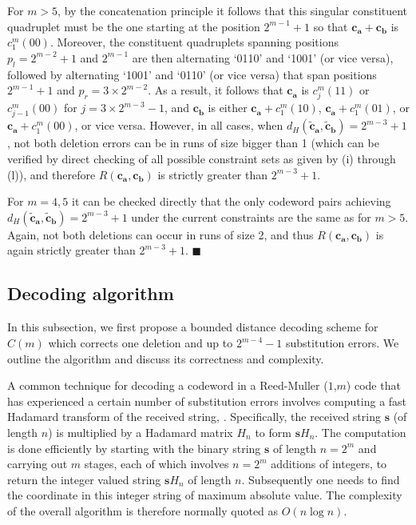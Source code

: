 For $m>5$, by the concatenation principle it follows that this
singular constituent quadruplet must be the one starting at the
position $2^{m-1}+1$ so that $\mathbf{c_a}+\mathbf{c_b}$ is
$c_1^m(00)$. Moreover, the constituent quadruplets spanning
positions $p_l=2^{m-2}+1$ and $2^{m-1}$ are then alternating
`0110' and `1001' (or vice versa), followed by alternating `1001'
and `0110' (or vice versa) that span positions $2^{m-1}+1$ and
$p_r=3\times 2^{m-2}$. As a result, it follows that $\mathbf{c_a}$
is $c_j^m(11)$ or $c_{j-1}^m(00)$ for $j=3\times 2^{m-3}-1$, and
$\mathbf{c_b}$ is either $\mathbf{c_a}+c_1^m(10)$,
$\mathbf{c_a}+c_1^m(01)$, or $\mathbf{c_a}+c_1^m(00)$, or vice
versa. However, in all cases, when
$d_{H}(\mathbf{\tilde{c}_a},\mathbf{\tilde{c}_b})=2^{m-3}+1$, not
both deletion errors can be in runs of size bigger than 1 (which
can be verified by direct checking of all possible constraint sets
as given by (i) through (l)), and therefore
$R(\mathbf{c_a},\mathbf{c_b})$ is strictly greater than
$2^{m-3}+1$.

For $m =4, 5$ it can be checked directly that the only codeword
pairs achieving
$d_{H}(\mathbf{\tilde{c}_a},\mathbf{\tilde{c}_b})=2^{m-3}+1$ under
the current constraints are the same as for $m>5$. Again, not both
deletions can occur in runs of size 2, and thus
$R(\mathbf{c_a},\mathbf{c_b})$ is again strictly greater than
$2^{m-3}+1$. \hfill$\blacksquare$



\subsection{Decoding algorithm}\label{sectiondecalg}

In this subsection, we first propose a bounded distance decoding
scheme for ${\hat C}(m)$ which corrects one deletion and up to
$2^{m-4}-1$ substitution errors. We outline the algorithm and
discuss its correctness and complexity.


A common technique for decoding a codeword in a Reed-Muller
($1$,$m$) code that has experienced a certain number of
substitution errors involves computing a fast Hadamard transform
of the received string, \cite[$\S$4, Ch.14]{mws:77}. Specifically,
the received string $\mathbf{s}$ (of length $n$) is multiplied by
a Hadamard matrix $H_n$ to form $\mathbf{s} H_n$. The computation
is done efficiently by starting with the binary string
$\mathbf{s}$ of length $n =2^m$ and carrying out $m$ stages, each
of which involves $n = 2^m$ additions of integers, to return the
integer valued string $\mathbf{s} H_n$ of length $n$. Subsequently
one needs to find the coordinate in this integer string of maximum
absolute value. The complexity of the overall algorithm is
therefore normally quoted as $O(n \log n)$.

